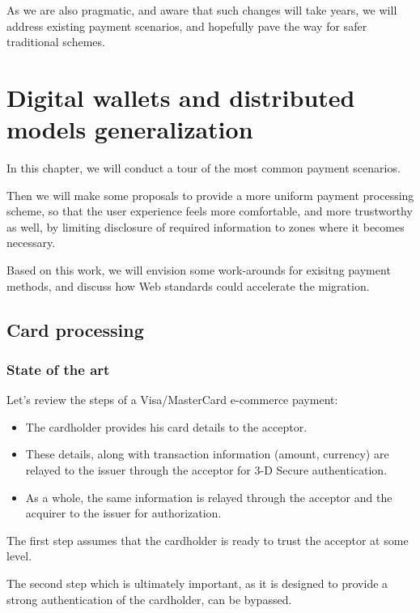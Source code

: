 As we are also pragmatic, and aware that such changes will take years,
we will address existing payment scenarios, and hopefully pave the way
for safer traditional schemes.

\section{Digital wallets and distributed models
generalization}\label{digital-wallets-and-distributed-models-generalization}

In this chapter, we will conduct a tour of the most common payment
scenarios.

Then we will make some proposals to provide a more uniform payment
processing scheme, so that the user experience feels more comfortable,
and more trustworthy as well, by limiting disclosure of required
information to zones where it becomes necessary.

Based on this work, we will envision some work-arounds for exisitng
payment methods, and discuss how Web standards could accelerate the
migration.

\subsection{Card processing}\label{card-processing}

\subsubsection{State of the art}\label{state-of-the-art}

Let's review the steps of a Visa/MasterCard e-commerce payment:

\begin{itemize}
\item
  The cardholder provides his card details to the acceptor.
\item
  These details, along with transaction information (amount, currency)
  are relayed to the issuer through the acceptor for 3-D Secure
  authentication.
\item
  As a whole, the same information is relayed through the acceptor and
  the acquirer to the issuer for authorization.
\end{itemize}

The first step assumes that the cardholder is ready to trust the
acceptor at some level.

The second step which is ultimately important, as it is designed to
provide a strong authentication of the cardholder, can be bypassed.

